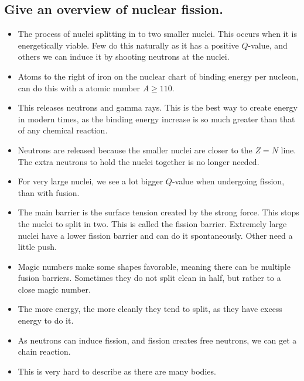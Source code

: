 \documentclass{article}
\begin{document}
\subsection{Give an overview of nuclear fission.}
\begin{itemize}
    \item The process of nuclei splitting in to two smaller nuclei. This occurs when it is energetically viable. Few do this naturally as it has a positive $Q$-value, and others we can induce it by shooting neutrons at the nuclei. 
    \item Atoms to the right of iron on the nuclear chart of binding energy per nucleon, can do this with a atomic number $A ≥ 110$. 
    \item This releases neutrons and gamma rays. This is the best way to create energy in modern times, as the binding energy increase is so much greater than that of any chemical reaction. 
    \item Neutrons are released because the smaller nuclei are closer to the $Z=N$ line. The extra neutrons to hold the nuclei together is no longer needed. 
    \item For very large nuclei, we see a lot bigger $Q$-value when undergoing fission, than with fusion. 
    \item The main barrier is the surface tension created by the strong force. This stops the nuclei to split in two. This is called the fission barrier. Extremely large nuclei have a lower fission barrier and can do it spontaneously. Other need a little push. 
    \item Magic numbers make some shapes favorable, meaning there can be multiple fusion barriers. Sometimes they do not split clean in half, but rather to a close magic number. 
    \item The more energy, the more cleanly they tend to split, as they have excess energy to do it. 
    \item As neutrons can induce fission, and fission creates free neutrons, we can get a chain reaction. 
    \item This is very hard to describe as there are many bodies. 
\end{itemize}
\end{document}
